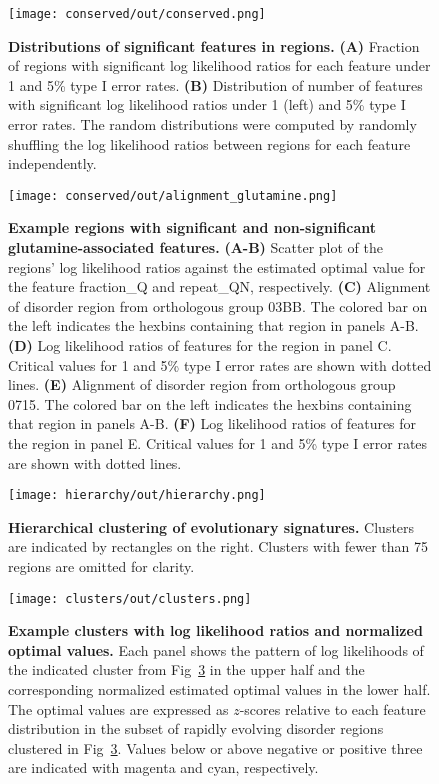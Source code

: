 \begin{figure}[h!]
\texttt{[image: conserved/out/conserved.png]}
\centering
\caption{\textbf{Distributions of significant features in regions.}
\textbf{(A)} Fraction of regions with significant log likelihood ratios for each feature under 1 and 5\% type I error rates.
\textbf{(B)} Distribution of number of features with significant log likelihood ratios under 1 (left) and 5\% type I error rates. The random distributions were computed by randomly shuffling the log likelihood ratios between regions for each feature independently.}
\label{fig:conserved}
\end{figure}

\begin{figure}[h!]
\texttt{[image: conserved/out/alignment\_glutamine.png]}
\centering
\caption{\textbf{Example regions with significant and non-significant glutamine-associated features.}
\textbf{(A-B)} Scatter plot of the regions' log likelihood ratios against the estimated optimal value for the feature fraction\_Q and repeat\_QN, respectively.
\textbf{(C)} Alignment of disorder region from orthologous group 03BB. The colored bar on the left indicates the hexbins containing that region in panels A-B.
\textbf{(D)} Log likelihood ratios of features for the region in panel C. Critical values for 1 and 5\% type I error rates are shown with dotted lines.
\textbf{(E)} Alignment of disorder region from orthologous group 0715. The colored bar on the left indicates the hexbins containing that region in panels A-B.
\textbf{(F)} Log likelihood ratios of features for the region in panel E. Critical values for 1 and 5\% type I error rates are shown with dotted lines.}
\label{fig:alignment}
\end{figure}

\begin{figure}[h!]
\texttt{[image: hierarchy/out/hierarchy.png]}
\centering
\caption{\textbf{Hierarchical clustering of evolutionary signatures.}
Clusters are indicated by rectangles on the right. Clusters with fewer than 75 regions are omitted for clarity.}
\label{fig:hierarchy}
\end{figure}

\begin{figure}[h!]
\texttt{[image: clusters/out/clusters.png]}
\centering
\caption{\textbf{Example clusters with log likelihood ratios and normalized optimal values.}
Each panel shows the pattern of log likelihoods of the indicated cluster from Fig~\ref{fig:hierarchy} in the upper half and the corresponding normalized estimated optimal values in the lower half. The optimal values are expressed as $z$-scores relative to each feature distribution in the subset of rapidly evolving disorder regions clustered in Fig~\ref{fig:hierarchy}. Values below or above negative or positive three are indicated with magenta and cyan, respectively.}
\label{fig:clusters}
\end{figure}
